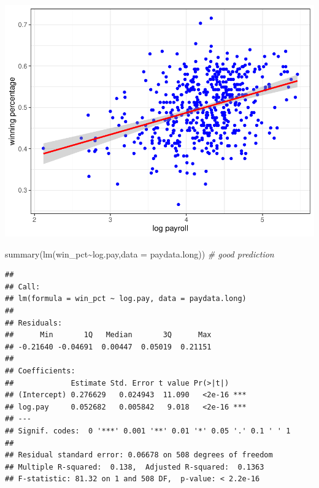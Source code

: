 \documentclass[
  12pt,
]{article}
\newenvironment{Shaded}{\begin{snugshade}}{\end{snugshade}}
\newcommand{\AttributeTok}[1]{\textcolor[rgb]{0.77,0.63,0.00}{#1}}
\newcommand{\CommentTok}[1]{\textcolor[rgb]{0.56,0.35,0.01}{\textit{#1}}}
\newcommand{\FunctionTok}[1]{\textcolor[rgb]{0.00,0.00,0.00}{#1}}
\newcommand{\NormalTok}[1]{#1}
\newcommand{\SpecialCharTok}[1]{\textcolor[rgb]{0.00,0.00,0.00}{#1}}
\begin{document}
\includegraphics{hw1_sol_files/figure-latex/unnamed-chunk-17-1.pdf}

\begin{Shaded}
\begin{Highlighting}[]
\FunctionTok{summary}\NormalTok{(}\FunctionTok{lm}\NormalTok{(win\_pct}\SpecialCharTok{\textasciitilde{}}\NormalTok{log.pay,}\AttributeTok{data =}\NormalTok{ paydata.long)) }\CommentTok{\# good prediction}
\end{Highlighting}
\end{Shaded}

\begin{verbatim}
## 
## Call:
## lm(formula = win_pct ~ log.pay, data = paydata.long)
## 
## Residuals:
##      Min       1Q   Median       3Q      Max 
## -0.21640 -0.04691  0.00447  0.05019  0.21151 
## 
## Coefficients:
##             Estimate Std. Error t value Pr(>|t|)    
## (Intercept) 0.276629   0.024943  11.090   <2e-16 ***
## log.pay     0.052682   0.005842   9.018   <2e-16 ***
## ---
## Signif. codes:  0 '***' 0.001 '**' 0.01 '*' 0.05 '.' 0.1 ' ' 1
## 
## Residual standard error: 0.06678 on 508 degrees of freedom
## Multiple R-squared:  0.138,  Adjusted R-squared:  0.1363 
## F-statistic: 81.32 on 1 and 508 DF,  p-value: < 2.2e-16
\end{verbatim}
\end{document}
